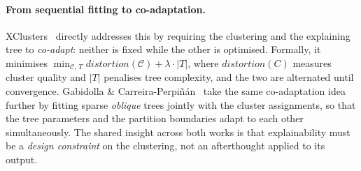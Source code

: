 \documentclass{article}
\theoremstyle{plain}
\theoremstyle{definition}
\theoremstyle{remark}
\begin{document}
\paragraph{From sequential fitting to co-adaptation.}
XClusters~\cite{hwang_xclusters_2023} directly addresses this by requiring the
clustering and the explaining tree to \emph{co-adapt}: neither is fixed
while the other is optimised. 
Formally, it minimises
$\min_{\mathcal{C},\,T} distortion(\mathcal{C}) + \lambda \cdot |T|$, where $distortion(C)$ measures cluster quality and $|T|$ penalises tree complexity, 
and the two are alternated until convergence.
Gabidolla \& Carreira-Perpi\~n\'an~\cite{gabidolla_optimal_2022} take the same
co-adaptation idea further by fitting sparse \emph{oblique} trees jointly
with the cluster assignments, so that the tree parameters and the
partition boundaries adapt to each other simultaneously.
The shared insight across both works is that explainability must be a
\emph{design constraint} on the clustering, not an afterthought applied
to its output.
\end{document}
